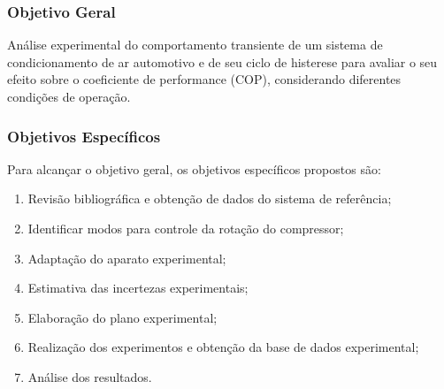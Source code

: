 \subsubsection{Objetivo Geral}

Análise experimental do comportamento transiente de um sistema de condicionamento de ar automotivo e de seu ciclo de histerese para avaliar o seu efeito sobre o coeficiente de performance (COP), considerando diferentes condições de operação.

\subsubsection{Objetivos Específicos}

Para alcançar o objetivo geral, os objetivos específicos propostos são:

\begin{enumerate}[label=\arabic*]
    \item Revisão bibliográfica e obtenção de dados do sistema de referência;
    
    \item Identificar modos para controle da rotação do compressor;
    
    \item Adaptação do aparato experimental;
    
    \item Estimativa das incertezas experimentais;

    \item Elaboração do plano experimental;
    
    \item Realização dos experimentos e obtenção da base de dados experimental;
    
    \item Análise dos resultados.

\end{enumerate}
